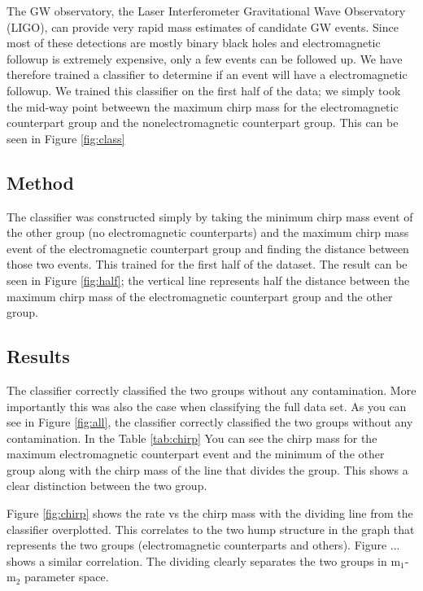 The GW observatory, the Laser Interferometer Gravitational Wave Observatory (LIGO), can provide very rapid mass estimates of candidate GW events. Since most of these detections are mostly binary black holes and electromagnetic followup is extremely expensive, only a few events can be followed up. We have therefore trained a classifier to determine if an event will have a electromagnetic followup. We trained this classifier on the first half of the data; we simply took the mid-way point betweewn the maximum chirp mass for the electromagnetic counterpart group and the nonelectromagnetic counterpart group. This can be seen in Figure \ref{fig:class} 

\subsection{Method}
The classifier was constructed simply by taking the minimum chirp mass event of the other group (no electromagnetic counterparts) and the maximum chirp mass event of the electromagnetic counterpart group and finding the distance between those two events. This trained for the first half of the dataset. The result can be seen in Figure \ref{fig:half}; the vertical line represents half the distance between the maximum chirp mass of the electromagnetic counterpart group and the other group.

\subsection{Results}
The classifier correctly classified the two groups without any contamination. More importantly this was also the case when classifying the full data set. As you can see in Figure \ref{fig:all}, the classifier correctly classified the two groups without any contamination. In the Table \ref{tab:chirp} You can see the chirp mass for the maximum electromagnetic counterpart event and the minimum of the other group along with the chirp mass of the line that divides the group. This shows a clear distinction between the two group.



Figure \ref{fig:chirp} shows the rate vs the chirp mass with the dividing line from the classifier overplotted. This correlates to the two hump structure in the graph that represents the two groups (electromagnetic counterparts and others). Figure ... shows a similar correlation. The dividing clearly separates the two groups in  m$_{1}$-m$_{2}$ parameter space.